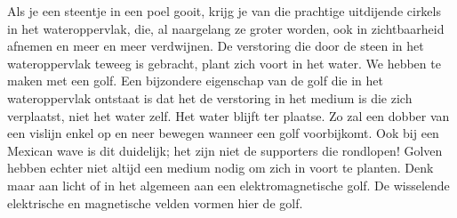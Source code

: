 \documentclass{ximera}
\begin{document}
	\author{Bart Lambregs}
    \xmsource\xmuitleg



	Als je een steentje in een poel gooit, krijg je van die prachtige uitdijende cirkels in het wateroppervlak, die, al naargelang ze groter worden, ook in zichtbaarheid afnemen en meer en meer verdwijnen. De verstoring die door de steen in het wateroppervlak teweeg is gebracht, plant zich voort in het water. We hebben te maken met een golf.
	Een bijzondere eigenschap van de golf die in het wateroppervlak ontstaat is dat het de verstoring in het medium is die zich verplaatst, niet het water zelf. Het water blijft ter plaatse. Zo zal een dobber van een vislijn enkel op en neer bewegen wanneer een golf voorbijkomt. Ook bij een Mexican wave is dit duidelijk; het zijn niet de supporters die rondlopen!
	Golven hebben echter niet altijd een medium nodig om zich in voort te planten. Denk maar aan licht of in het algemeen aan een elektromagnetische golf. De wisselende elektrische en magnetische velden vormen hier de golf.
	
	
	
	
\end{document}
